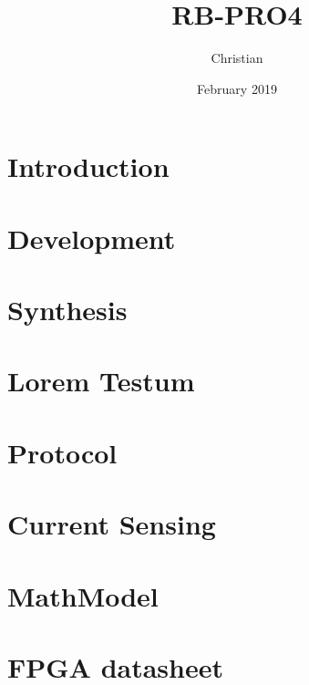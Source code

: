 \documentclass{report}
\title{RB-PRO4}
\author{Christian}
\date{February 2019}
\begin{document}

\maketitle

\begin{abstract}

\end{abstract}

\tableofcontents

\newpage
{}

\chapter{Introduction}


\chapter{Development}


\chapter{Synthesis}


\chapter{Lorem Testum}


\chapter{Protocol}


\chapter{Current Sensing}


\chapter{MathModel}


\newpage
\printbibliography

\chapter{FPGA datasheet}

\end{document}
